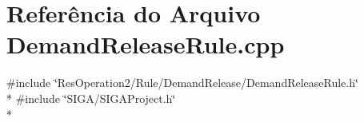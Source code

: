\section{Referência do Arquivo Demand\+Release\+Rule.\+cpp}
\label{_demand_release_rule_8cpp}
{\ttfamily \#include \char`\"{}Res\+Operation2/\+Rule/\+Demand\+Release/\+Demand\+Release\+Rule.\+h\char`\"{}}\\*
{\ttfamily \#include \char`\"{}S\+I\+G\+A/\+S\+I\+G\+A\+Project.\+h\char`\"{}}\\*
